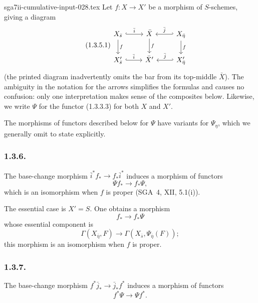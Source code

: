 \begin{filecontents*}{sga7ii-cumulative-input-028.tex}
Let $f:X\longrightarrow X'$ be a morphism of $S$-schemes, giving a
diagram
\begin{equation}\tag{1.3.5.1}
\begin{tikzcd}
X_{\bar s} \arrow[r, hook, "\bar i"] \arrow[d, "f"]
  & \bar X \arrow[d, "f"]
  & X_{\bar\eta} \arrow[l, hook', "\bar j"'] \arrow[d, "f"] \\
X'_{\bar s} \arrow[r, hook, "\bar i"]
  & \bar X' & X'_{\bar\eta} \arrow[l, hook', "\bar j"']
\end{tikzcd}
\end{equation}
(the printed diagram inadvertently omits the bar from its top-middle
$\bar X$).  The ambiguity in the notation for the arrows simplifies
the formulas and causes no confusion: only one interpretation makes
sense of the composites below.  Likewise, we write $\Psi$ for the
functor (1.3.3.3) for both $X$ and $X'$.

The morphisms of functors described below for $\Psi$ have variants for
$\Psi_\eta$, which we generally omit to state explicitly.

\subsubsection*{1.3.6.}
The base-change morphism
$\bar i^*f_*\longrightarrow f_*\bar i^*$ induces a morphism of
functors
\begin{equation}\tag{1.3.6.1}
\Psi f_*\longrightarrow f_*\Psi,
\end{equation}
which is an isomorphism when $f$ is proper (SGA~4, XII, 5.1(i)).

The essential case is $X'=S$.  One obtains a morphism
\begin{equation}\tag{1.3.6.2}
f_*\longrightarrow f_*\Psi
\end{equation}
whose essential component is
\begin{equation}\tag{1.3.6.3}
\Gamma(X_{\bar\eta},F)
\longrightarrow
\Gamma(X_{\bar s},\Psi_{\bar\eta}(F));
\end{equation}
this morphism is an isomorphism when $f$ is proper.

\subsubsection*{1.3.7.}
The base-change morphism
$f^*\bar j_*\longrightarrow\bar j_*f^*$ induces a morphism of
functors
\begin{equation}\tag{1.3.7.1}
f^*\Psi\longrightarrow\Psi f^*.
\end{equation}


\end{filecontents*}
